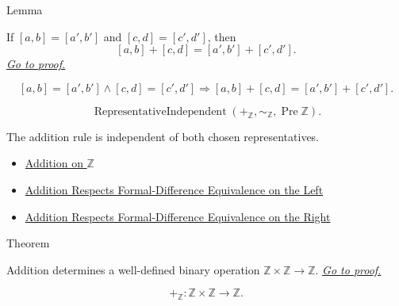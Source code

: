 \begin{lemmabox}{Lemma}
\begin{lemma}
\label{lem:addition-on-z-classes-respects-equivalence}
If $[a,b]=[a',b']$ and $[c,d]=[c',d']$, then
\[
[a,b]+[c,d]=[a',b']+[c',d'].
\]
\hyperref[prf:addition-on-z-classes-respects-equivalence]{\textit{Go to proof.}}
\end{lemma}
\end{lemmabox}

\begin{remark*}
\[
[a,b]=[a',b']\land[c,d]=[c',d']
\Longrightarrow
[a,b]+[c,d]=[a',b']+[c',d'].
\]
\end{remark*}

\begin{remark*}
\[
\operatorname{RepresentativeIndependent}(+_{\mathbb{Z}},\sim_{\mathbb{Z}},\operatorname{Pre}\mathbb{Z}).
\]
\end{remark*}

\begin{remark*}[Interpretation]
The addition rule is independent of both chosen representatives.
\end{remark*}

\begin{dependencies}
\begin{itemize}
  \item \hyperref[def:addition-on-z-classes]{Addition on $\mathbb{Z}$}
  \item \hyperref[lem:addition-on-z-classes-respects-left-equivalence]{Addition Respects Formal-Difference Equivalence on the Left}
  \item \hyperref[lem:addition-on-z-classes-respects-right-equivalence]{Addition Respects Formal-Difference Equivalence on the Right}
\end{itemize}
\end{dependencies}

\begin{theorembox}{Theorem}
\begin{theorem}
\label{thm:addition-on-z-well-defined}
Addition determines a well-defined binary operation
$\mathbb{Z}\times\mathbb{Z}\to\mathbb{Z}$.
\hyperref[prf:addition-on-z-well-defined]{\textit{Go to proof.}}
\end{theorem}
\end{theorembox}

\begin{remark*}
\[
+_{\mathbb{Z}}:\mathbb{Z}\times\mathbb{Z}\to\mathbb{Z}.
\]
\end{remark*}

